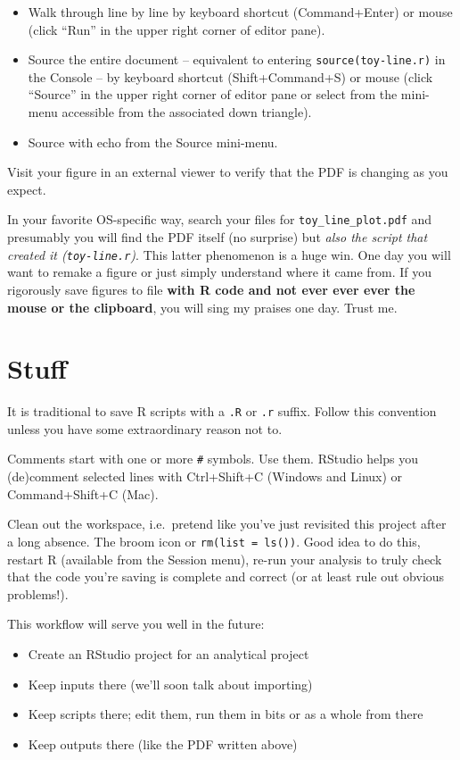 \documentclass[
]{book}
\providecommand{\tightlist}{%
  \setlength{\itemsep}{0pt}\setlength{\parskip}{0pt}}
\begin{document}
\begin{itemize}
\item
  Walk through line by line by keyboard shortcut (Command+Enter) or mouse (click ``Run'' in the upper right corner of editor pane).
\item
  Source the entire document -- equivalent to entering \texttt{source(\textquotesingle{}toy-line.r\textquotesingle{})} in the Console -- by keyboard shortcut (Shift+Command+S) or mouse (click ``Source'' in the upper right corner of editor pane or select from the mini-menu accessible from the associated down triangle).
\item
  Source with echo from the Source mini-menu.
\end{itemize}

Visit your figure in an external viewer to verify that the PDF is changing as you expect.

In your favorite OS-specific way, search your files for \texttt{toy\_line\_plot.pdf} and presumably you will find the PDF itself (no surprise) but \emph{also the script that created it (\texttt{toy-line.r})}. This latter phenomenon is a huge win. One day you will want to remake a figure or just simply understand where it came from. If you rigorously save figures to file \textbf{with R code and not ever ever ever the mouse or the clipboard}, you will sing my praises one day. Trust me.

\hypertarget{stuff}{%
\section{Stuff}\label{stuff}}

It is traditional to save R scripts with a \texttt{.R} or \texttt{.r} suffix. Follow this convention unless you have some extraordinary reason not to.

Comments start with one or more \texttt{\#} symbols. Use them. RStudio helps you (de)comment selected lines with Ctrl+Shift+C (Windows and Linux) or Command+Shift+C (Mac).

Clean out the workspace, i.e.~pretend like you've just revisited this project after a long absence. The broom icon or \texttt{rm(list\ =\ ls())}. Good idea to do this, restart R (available from the Session menu), re-run your analysis to truly check that the code you're saving is complete and correct (or at least rule out obvious problems!).

This workflow will serve you well in the future:

\begin{itemize}
\tightlist
\item
  Create an RStudio project for an analytical project
\item
  Keep inputs there (we'll soon talk about importing)
\item
  Keep scripts there; edit them, run them in bits or as a whole from there
\item
  Keep outputs there (like the PDF written above)
\end{itemize}
\end{document}
